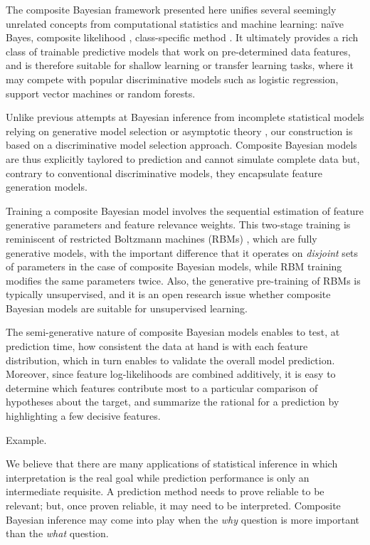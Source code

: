 \documentclass[english]{scrartcl}
\begin{document}
The composite Bayesian framework presented here unifies several seemingly unrelated concepts from computational statistics and machine learning: na\"ive Bayes, composite likelihood \cite{Varin-11}, class-specific method \cite{Baggenstoss-03}. It ultimately provides a rich class of trainable predictive models that work on pre-determined data features, and is therefore suitable for shallow learning or transfer learning tasks, where it may compete with popular discriminative models such as logistic regression, support vector machines or random forests.

Unlike previous attempts at Bayesian inference from incomplete statistical models relying on generative model selection \cite{Yuan-99b,Wang-14} or asymptotic theory \cite{Pauli-11,Ribatet-12}, our construction is based on a discriminative model selection approach. Composite Bayesian models are thus explicitly taylored to prediction and cannot simulate complete data but, contrary to conventional discriminative models, they encapsulate feature generation models.

Training a composite Bayesian model involves the sequential estimation of feature generative parameters and feature relevance weights. This two-stage training is reminiscent of restricted Boltzmann machines (RBMs) \cite{Hinton-06,Fischer-14}, which are fully generative models, with the important difference that it operates on {\em disjoint} sets of parameters in the case of composite Bayesian models, while RBM training modifies the same parameters twice. Also, the generative pre-training of RBMs is typically unsupervised, and it is an open research issue whether composite Bayesian models are suitable for unsupervised learning.

The semi-generative nature of composite Bayesian models enables to test, at prediction time, how consistent the data at hand is with each feature distribution, which in turn enables to validate the overall model prediction. Moreover, since feature log-likelihoods are combined additively, it is easy to determine which features contribute most to a particular comparison of hypotheses about the target, and summarize the rational for a prediction by highlighting a few decisive features. 

{\color{red}Example.}

We believe that there are many applications of statistical inference in which interpretation is the real goal while prediction performance is only an intermediate requisite. A prediction method needs to prove reliable to be relevant; but, once proven reliable, it may need to be interpreted. Composite Bayesian inference may come into play when the {\em why} question is more important than the {\em what} question.
\end{document}
